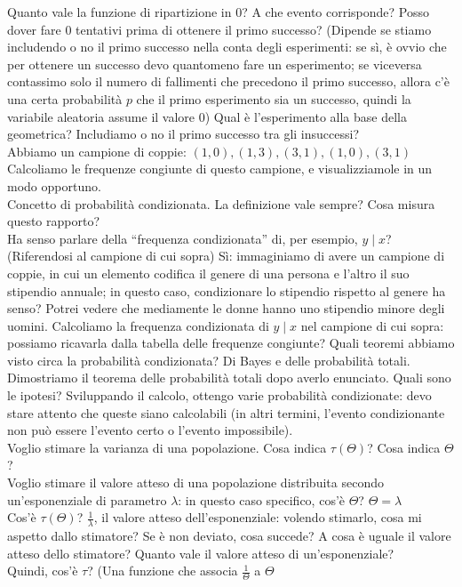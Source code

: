 \documentclass{article}
\begin{document}
    Quanto vale la funzione di ripartizione in $ 0 $? A che evento corrisponde? Posso dover fare $ 0 $ tentativi prima di ottenere il primo successo? (Dipende se stiamo includendo o no
    il primo successo nella conta degli esperimenti: se sì, è ovvio che per ottenere un successo devo quantomeno fare un esperimento; se viceversa contassimo solo il numero di
    fallimenti che precedono il primo successo, allora c'è una certa probabilità $ p $ che il primo esperimento sia un successo, quindi la variabile aleatoria assume il valore $ 0 $)
    Qual è l'esperimento alla base della geometrica? Includiamo o no il primo successo tra gli insuccessi? \\
    
    Abbiamo un campione di coppie: $ (1, 0), (1, 3), (3, 1), (1, 0), (3, 1) $ \\
    Calcoliamo le frequenze congiunte di questo campione, e visualizziamole in un modo opportuno. \\
    Concetto di probabilità condizionata. La definizione vale sempre? Cosa misura questo rapporto? \\
    Ha senso parlare della “frequenza condizionata” di, per esempio, $ y \mid x $? (Riferendosi al campione di cui sopra) Sì: immaginiamo di avere un campione di coppie, in
    cui un elemento codifica il genere di una persona e l'altro il suo stipendio annuale; in questo caso, condizionare lo stipendio rispetto al genere ha senso? Potrei vedere
    che mediamente le donne hanno uno stipendio minore degli uomini. Calcoliamo la frequenza condizionata di $ y \mid x $ nel campione di cui sopra: possiamo ricavarla dalla
    tabella delle frequenze congiunte? Quali teoremi abbiamo visto circa la probabilità condizionata? Di Bayes e delle probabilità totali. Dimostriamo il teorema delle
    probabilità totali dopo averlo enunciato. Quali sono le ipotesi? Sviluppando il calcolo, ottengo varie probabilità condizionate: devo stare attento che queste siano
    calcolabili (in altri termini, l'evento condizionante non può essere l'evento certo o l'evento impossibile). \\
    Voglio stimare la varianza di una popolazione. Cosa indica $ \tau ( \Theta ) $? Cosa indica $ \Theta $? \\
    Voglio stimare il valore atteso di una popolazione distribuita secondo un'esponenziale di parametro $ \lambda $: in questo caso specifico, cos'è $ \Theta $?
    $ \Theta = \lambda $ \\
    Cos'è $ \tau ( \Theta ) $? $ \frac{ 1 }{ \lambda } $, il valore atteso dell'esponenziale: volendo stimarlo, cosa mi aspetto dallo stimatore? Se è non deviato, cosa
    succede? A cosa è uguale il valore atteso dello stimatore? Quanto vale il valore atteso di un'esponenziale? \\
    Quindi, cos'è $ \tau $? (Una funzione che associa $ \frac{ 1 }{ \Theta} $ a $ \Theta $  \\
    
\end{document}

